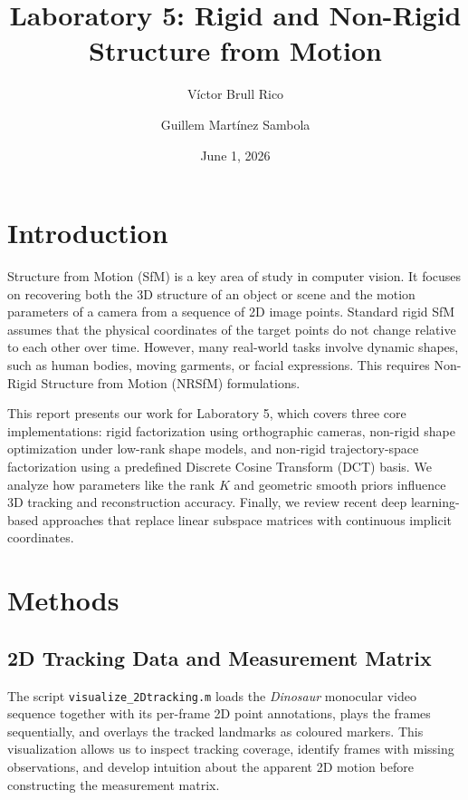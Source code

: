 \documentclass{article}
\title{Laboratory 5: Rigid and Non-Rigid Structure from Motion}
\author{Víctor Brull Rico \and Guillem Martínez Sambola}
\date{June 1, 2026}
\begin{document}
\maketitle

\section{Introduction}

Structure from Motion (SfM) is a key area of study in computer vision. It focuses on recovering both the 3D structure of an object or scene and the motion parameters of a camera from a sequence of 2D image points. Standard rigid SfM assumes that the physical coordinates of the target points do not change relative to each other over time. However, many real-world tasks involve dynamic shapes, such as human bodies, moving garments, or facial expressions. This requires Non-Rigid Structure from Motion (NRSfM) formulations.

This report presents our work for Laboratory 5, which covers three core implementations: rigid factorization using orthographic cameras, non-rigid shape optimization under low-rank shape models, and non-rigid trajectory-space factorization using a predefined Discrete Cosine Transform (DCT) basis. We analyze how parameters like the rank $K$ and geometric smooth priors influence 3D tracking and reconstruction accuracy. Finally, we review recent deep learning-based approaches that replace linear subspace matrices with continuous implicit coordinates.

\section{Methods}
\label{sec:Methods}

\subsection{2D Tracking Data and Measurement Matrix}

The script \texttt{visualize\_2Dtracking.m} loads the \emph{Dinosaur} monocular video sequence together with its per-frame 2D point annotations, plays the frames sequentially, and overlays the tracked landmarks as coloured markers. This visualization allows us to inspect tracking coverage, identify frames with missing observations, and develop intuition about the apparent 2D motion before constructing the measurement matrix.
\end{document}
